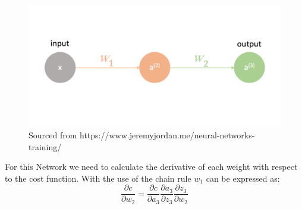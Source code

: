 \begin{flushleft}
                    \begin{figure}[H]
                        \centering 
                        \includegraphics[width=14cm]{Images/ModellingOfProblem/SingleLayerNeuralNetEdited.png}
                        \caption*{Sourced from https://www.jeremyjordan.me/neural-networks-training/}
                    \end{figure}
                    
                    

                    For this Network we need to calculate the derivative of each weight with respect to the cost function. With
                    the use of the chain rule $w_1$ can be expressed as: \\

                    \[\frac{\partial c}{\partial w_{2}} = \frac{\partial c}{\partial a_3} \frac{\partial a_3}{\partial z_3} \frac{\partial z_3}{\partial w_2}\]


\end{flushleft}
